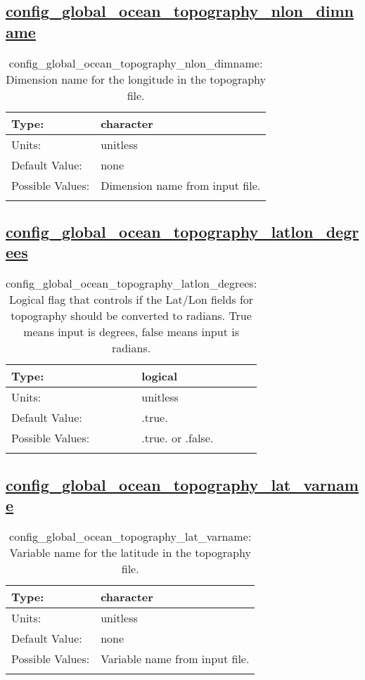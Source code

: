 \subsection[config\_global\_ocean\_topography\_nlon\_dimname]{\hyperref[sec:nm_tab_global_ocean]{config\_global\_ocean\_topography\_nlon\_dimname}}
\label{subsec:nm_sec_config_global_ocean_topography_nlon_dimname}
\begin{center}
\begin{longtable}{| p{2.0in} || p{4.0in} |}
    \hline
    Type: & character \\
    \hline
    Units: & \si{unitless} \\
    \hline
    Default Value: & none \\
    \hline
    Possible Values: & Dimension name from input file. \\
    \hline
    \caption{config\_global\_ocean\_topography\_nlon\_dimname: Dimension name for the longitude in the topography file.}
\end{longtable}
\end{center}
\subsection[config\_global\_ocean\_topography\_latlon\_degrees]{\hyperref[sec:nm_tab_global_ocean]{config\_global\_ocean\_topography\_latlon\_degrees}}
\label{subsec:nm_sec_config_global_ocean_topography_latlon_degrees}
\begin{center}
\begin{longtable}{| p{2.0in} || p{4.0in} |}
    \hline
    Type: & logical \\
    \hline
    Units: & \si{unitless} \\
    \hline
    Default Value: & .true. \\
    \hline
    Possible Values: & .true. or .false. \\
    \hline
    \caption{config\_global\_ocean\_topography\_latlon\_degrees: Logical flag that controls if the Lat/Lon fields for topography should be converted to radians. True means input is degrees, false means input is radians.}
\end{longtable}
\end{center}
\subsection[config\_global\_ocean\_topography\_lat\_varname]{\hyperref[sec:nm_tab_global_ocean]{config\_global\_ocean\_topography\_lat\_varname}}
\label{subsec:nm_sec_config_global_ocean_topography_lat_varname}
\begin{center}
\begin{longtable}{| p{2.0in} || p{4.0in} |}
    \hline
    Type: & character \\
    \hline
    Units: & \si{unitless} \\
    \hline
    Default Value: & none \\
    \hline
    Possible Values: & Variable name from input file. \\
    \hline
    \caption{config\_global\_ocean\_topography\_lat\_varname: Variable name for the latitude in the topography file.}
\end{longtable}
\end{center}
